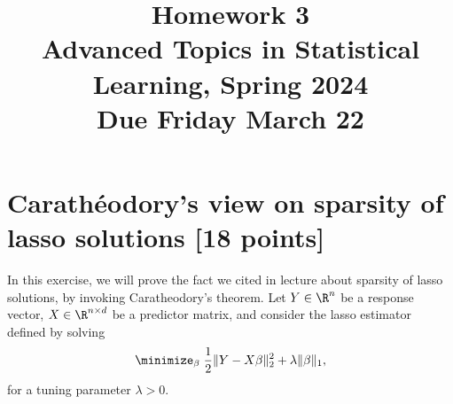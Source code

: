 \documentclass{article}
\title{Homework 3 \\ \smallskip
\large Advanced Topics in Statistical Learning, Spring 2024 \\ \smallskip
Due Friday March 22}
\date{}
\begin{document}
\maketitle
\RaggedRight
\vspace{-50pt}

\section{Carath\'{e}odory's view on sparsity of lasso solutions [18 points]} 

In this exercise, we will prove the fact we cited in lecture about sparsity of
lasso solutions, by invoking Caratheodory's theorem. Let $Y \in \R^n$ be a
response vector, $X \in \R^{n \times d}$ be a predictor matrix, and consider
the lasso estimator defined by solving
\[
\minimize_\beta \; \frac{1}{2} \|Y - X\beta\|_2^2 + \lambda \|\beta\|_1,
\]
for a tuning parameter $\lambda > 0$.
\end{document}
